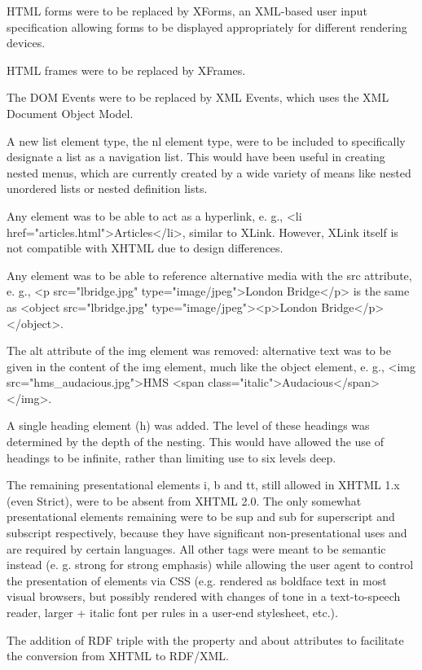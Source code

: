 \begin{compactitem}
\item HTML forms were to be replaced by XForms, an XML-based user input specification allowing forms to be displayed appropriately for different rendering devices.

\item HTML frames were to be replaced by XFrames.

\item The DOM Events were to be replaced by XML Events, which uses the XML Document Object Model.

\item A new list element type, the nl element type, were to be included to specifically designate a list as a navigation list. This would have been useful in creating nested menus, which are currently created by a wide variety of means like nested unordered lists or nested definition lists.

\item Any element was to be able to act as a hyperlink, e. g., <li href="articles.html">Articles</li>, similar to XLink. However, XLink itself is not compatible with XHTML due to design differences.

\item Any element was to be able to reference alternative media with the src attribute, e. g., <p src="lbridge.jpg" type="image/jpeg">London Bridge</p> is the same as <object src="lbridge.jpg" type="image/jpeg"><p>London Bridge</p></object>.

\item The alt attribute of the img element was removed: alternative text was to be given in the content of the img element, much like the object element, e. g., <img src="hms\_audacious.jpg">HMS <span class="italic">Audacious</span></img>.

\item A single heading element (h) was added. The level of these headings was determined by the depth of the nesting. This would have allowed the use of headings to be infinite, rather than limiting use to six levels deep.

\item The remaining presentational elements i, b and tt, still allowed in XHTML 1.x (even Strict), were to be absent from XHTML 2.0. The only somewhat presentational elements remaining were to be sup and sub for superscript and subscript respectively, because they have significant non-presentational uses and are required by certain languages. All other tags were meant to be semantic instead (e. g. strong for strong emphasis) while allowing the user agent to control the presentation of elements via CSS (e.g. rendered as boldface text in most visual browsers, but possibly rendered with changes of tone in a text-to-speech reader, larger + italic font per rules in a user-end stylesheet, etc.).

\item The addition of RDF triple with the property and about attributes to facilitate the conversion from XHTML to RDF/XML.
\end{compactitem}


